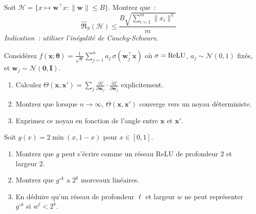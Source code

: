 \begin{exercice}
\label{exo:rademacher}
Soit $\mathcal{H} = \{x \mapsto \mathbf{w}^\top x : \|\mathbf{w}\| \leq B\}$.
Montrez que~:
\begin{equation}
\hat{\mathfrak{R}}_S(\mathcal{H}) \leq \frac{B\sqrt{\sum_{i=1}^{m}\|x_i\|^2}}{m}
\end{equation}
\textit{Indication~: utiliser l'in\'egalit\'e de Cauchy-Schwarz.}
\end{exercice}

\begin{exercice}
\label{exo:ntk-one-layer}
Consid\'erez $f(\mathbf{x}; \boldsymbol{\theta}) = \frac{1}{\sqrt{n}}\sum_{j=1}^{n} a_j\,\sigma(\mathbf{w}_j^\top \mathbf{x})$
o\`u $\sigma = \mathrm{ReLU}$, $a_j \sim \mathcal{N}(0, 1)$ fix\'es, et
$\mathbf{w}_j \sim \mathcal{N}(\mathbf{0}, \mathbf{I})$.
\begin{enumerate}
    \item Calculez $\Theta(\mathbf{x}, \mathbf{x}') = \sum_j \frac{\partial f}{\partial \mathbf{w}_j} \cdot \frac{\partial f}{\partial \mathbf{w}_j}$ explicitement.
    \item Montrez que lorsque $n \to \infty$, $\Theta(\mathbf{x}, \mathbf{x}')$ converge vers un noyau d\'eterministe.
    \item Exprimez ce noyau en fonction de l'angle entre $\mathbf{x}$ et $\mathbf{x}'$.
\end{enumerate}
\end{exercice}

\begin{exercice}
\label{exo:depth-separation}
Soit $g(x) = 2\min(x, 1-x)$ pour $x \in [0,1]$.
\begin{enumerate}
    \item Montrez que $g$ peut s'\'ecrire comme un r\'eseau ReLU de profondeur
          $2$ et largeur $2$.
    \item Montrez que $g^{\circ k}$ a $2^k$ morceaux lin\'eaires.
    \item En d\'eduire qu'un r\'eseau de profondeur $\ell$ et largeur $w$
          ne peut repr\'esenter $g^{\circ k}$ si $w^\ell < 2^k$.
\end{enumerate}
\end{exercice}

